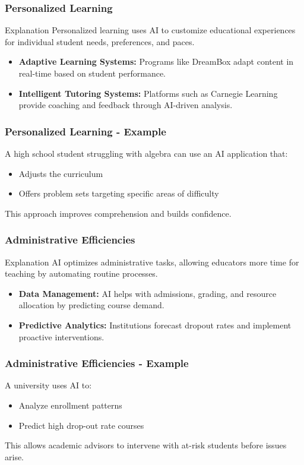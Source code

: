 \documentclass[aspectratio=169]{beamer}
\begin{document}
\begin{frame}[fragile]
    \frametitle{Personalized Learning}
    \begin{block}{Explanation}
        Personalized learning uses AI to customize educational experiences for individual student needs, preferences, and paces.
    \end{block}
    
    \begin{itemize}
        \item \textbf{Adaptive Learning Systems:} Programs like DreamBox adapt content in real-time based on student performance.
        \item \textbf{Intelligent Tutoring Systems:} Platforms such as Carnegie Learning provide coaching and feedback through AI-driven analysis.
    \end{itemize}
\end{frame}

\begin{frame}[fragile]
    \frametitle{Personalized Learning - Example}
    A high school student struggling with algebra can use an AI application that:
    \begin{itemize}
        \item Adjusts the curriculum
        \item Offers problem sets targeting specific areas of difficulty
    \end{itemize}
    This approach improves comprehension and builds confidence.
\end{frame}

\begin{frame}[fragile]
    \frametitle{Administrative Efficiencies}
    \begin{block}{Explanation}
        AI optimizes administrative tasks, allowing educators more time for teaching by automating routine processes.
    \end{block}
    
    \begin{itemize}
        \item \textbf{Data Management:} AI helps with admissions, grading, and resource allocation by predicting course demand.
        \item \textbf{Predictive Analytics:} Institutions forecast dropout rates and implement proactive interventions.
    \end{itemize}
\end{frame}

\begin{frame}[fragile]
    \frametitle{Administrative Efficiencies - Example}
    A university uses AI to:
    \begin{itemize}
        \item Analyze enrollment patterns
        \item Predict high drop-out rate courses
    \end{itemize}
    This allows academic advisors to intervene with at-risk students before issues arise.
\end{frame}
\end{document}
